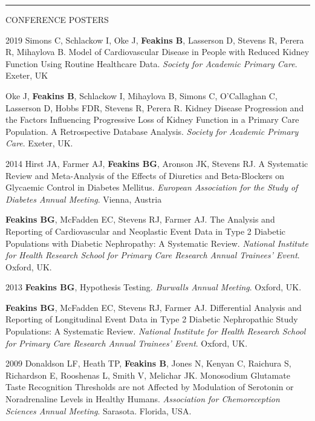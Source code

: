 \documentclass[10pt,a4paper]{article}
\begin{document}
\noindent\rule{\textwidth}{0.4pt}
\begin{cvlist}{CONFERENCE POSTERS}
  
  \item[2019]
  Simons C, Schlackow I, Oke J, \textbf{Feakins B}, Lasserson D, Stevens R, Perera R, Mihaylova B. Model of Cardiovascular Disease in People with Reduced Kidney Function Using Routine Healthcare Data. \textit{Society for Academic Primary Care}. Exeter, UK
  
  \item[]
  Oke J, \textbf{Feakins B}, Schlackow I, Mihaylova B, Simons C, O’Callaghan C, Lasserson D, Hobbs FDR, Stevens R, Perera R. Kidney Disease Progression and the Factors Influencing Progressive Loss of Kidney Function in a Primary Care Population. A Retrospective Database Analysis. \textit{Society for Academic Primary Care}. Exeter, UK.
  
  \item[2014]
  Hirst JA, Farmer AJ, \textbf{Feakins BG}, Aronson JK, Stevens RJ. A Systematic Review and Meta-Analysis of the Effects of Diuretics and Beta-Blockers on Glycaemic Control in Diabetes Mellitus. \textit{European Association for the Study of Diabetes Annual Meeting}. Vienna, Austria
  
  \item[]
  \textbf{Feakins BG}, McFadden EC, Stevens RJ, Farmer AJ. The Analysis and Reporting of Cardiovascular and Neoplastic Event Data in Type 2 Diabetic Populations with Diabetic Nephropathy: A Systematic Review. \textit{National Institute for Health Research School for Primary Care Research Annual Trainees' Event}. Oxford, UK.
  
  \item[2013]
  \textbf{Feakins BG}, Hypothesis Testing. \textit{Burwalls Annual Meeting}. Oxford, UK.
  
  \item[]
  \textbf{Feakins BG}, McFadden EC, Stevens RJ, Farmer AJ. Differential Analysis and Reporting of Longitudinal Event Data in Type 2 Diabetic Nephropathic Study Populations: A Systematic Review. \textit{National Institute for Health Research School for Primary Care Research Annual Trainees' Event}. Oxford, UK.
  
  \item[2009]
  Donaldson LF, Heath TP, \textbf{Feakins B}, Jones N, Kenyan C, Raichura S, Richardson E, Rooshenas L, Smith V, Melichar JK. Monosodium Glutamate Taste Recognition Thresholds are not Affected by Modulation of Serotonin or Noradrenaline Levels in Healthy Humans. \textit{Association for Chemoreception Sciences Annual Meeting}. Sarasota. Florida, USA.
  
\end{cvlist}
\end{document}
